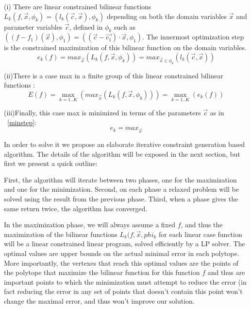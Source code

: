 (i) There are linear constrained bilinear functions $L_{k}(f,\vec{x},\phi_k) =  ( l_k(\vec{c},\vec{x}) ,\phi_k)$ depending on both the domain variables $\vec{x}$ and parameter variables $\vec{c}$, defined in $\phi_k$ such as $ ( (f - f_1)(\vec{x}),\phi_1) = ( (\vec{c}-\vec{c_1})\cdot\vec{x}, \phi_1)$. The innermost optimization step is the constrained maximization of this bilinear function on the domain variables.
\begin{equation} e_k(f) = max_{\vec{x}} ( L_k(f,\vec{x},\phi_k) ) = max_{ {\vec{x}} \in \phi_k} (l_k (\vec{c}, \vec{x}) ) \label{step1} \nonumber \end{equation}

(ii)There is a case max in a finite group of this linear constrained bilinear functions :
\begin{equation} E(f) = \max_{k=1..K} ( max_{\vec{x}} ( L_k(f,\vec{x},\phi_k) )) = \max_{k=1..K} ( e_k(f)) \label{step2}  \nonumber \end{equation}

(iii)Finally, this case max is minimized in terms of the parameters $\vec{c}$ as in ~\ref{minstep}:
\begin{equation} e_k = max_{\vec{x} } \end{equation}

In order to solve it we propose an elaborate iterative constraint generation based algorithm. The details of the algorithm will be exposed in the next section, but first we present a quick outline: 

First, the algorithm will iterate between two phases, one for the maximization and one for the minimization. Second, on each phase a relaxed problem will be solved using the result from the previous phase. Third, when a phase gives the same return twice, the algorithm has converged.

In the maximization phase, we will always assume a fixed $f$, and thus the maximization of the bilinear functions $L_{k}(f,\vec{x},phi_k$ for each linear case function will be a linear constrained linear program, solved efficiently by a LP solver. The optimal values are upper bounds on the actual minimal error in each polytope. More importantly, the vertexes that reach this optimal values are the points of the polytope that maximize the bilinear function for this function $f$ and thus are important points to which the minimization must attempt to reduce the error (in fact reducing the error in any set of points that doesn't contain this point won't change the maximal error, and thus won't improve our solution.

